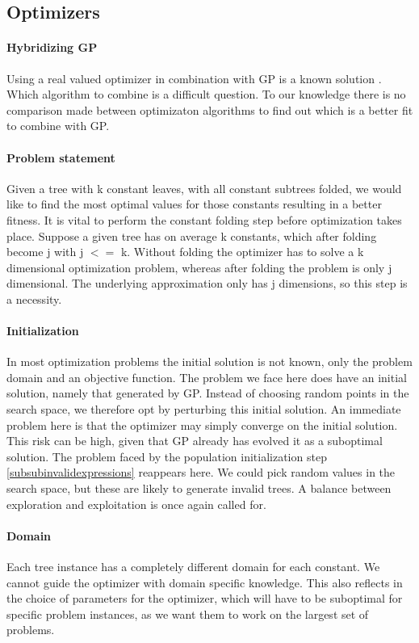 \subsection{Optimizers}

\paragraph{Hybridizing GP}
Using a real valued optimizer in combination with GP is a known solution \cite{GEDE, GPConst}.
Which algorithm to combine is a difficult question. To our knowledge there is no comparison made between optimizaton algorithms to find out which is a better fit to combine with GP. 

\paragraph{Problem statement}
Given a tree with k constant leaves, with all constant subtrees folded, we would like to find the most optimal values for those constants resulting in a better fitness. 
It is vital to perform the constant folding step before optimization takes place. Suppose a given tree has on average k constants, which after folding become j with j $<=$ k. Without folding the optimizer has to solve a k dimensional optimization problem, whereas after folding the problem is only j dimensional. The underlying approximation only has j dimensions, so this step is a necessity.

\paragraph{Initialization}
In most optimization problems the initial solution is not known, only the problem domain and an objective function. The problem we face here does have an initial solution, namely that generated by GP. Instead of choosing random points in the search space, we therefore opt by perturbing this initial solution. An immediate problem here is that the optimizer may simply converge on the initial solution. This risk can be high, given that GP already has evolved it as a suboptimal solution. 
The problem faced by the population initialization step \ref{subsubinvalidexpressions} reappears here. We could pick random values in the search space, but these are likely to generate invalid trees. A balance between exploration and exploitation is once again called for.

\paragraph{Domain}
Each tree instance has a completely different domain for each constant. We cannot guide the optimizer with domain specific knowledge. This also reflects in the choice of parameters for the optimizer, which will have to be suboptimal for specific problem instances, as we want them to work on the largest set of problems.

